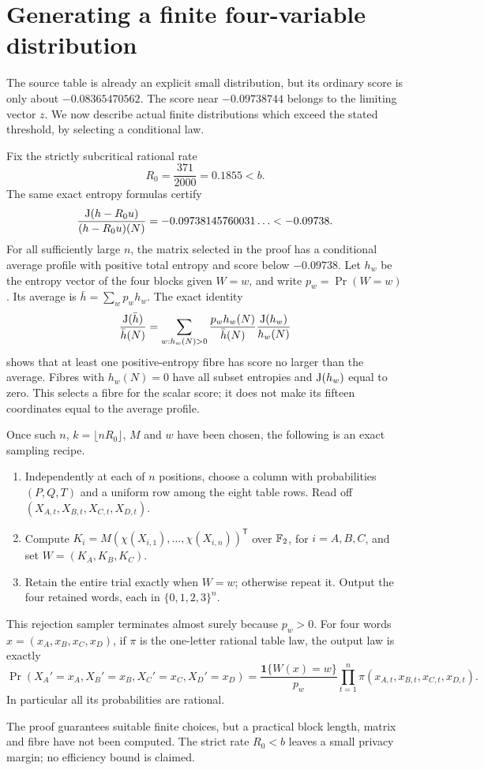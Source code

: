 \section{Generating a finite four-variable distribution}\label{sec:recipe}
The source table is already an explicit small distribution, but its
ordinary score is only about $-0.08365470562$. The score near
$-0.09738744$ belongs to the limiting vector $z$. We now describe actual
finite distributions which exceed the stated threshold, by selecting a conditional law.

Fix the strictly subcritical rational rate
\[
 R_0=\frac{371}{2000}=0.1855<b.
\]
The same exact entropy formulas certify
\[
 \frac{\operatorname{J}(h-R_0u)}{(h-R_0u)(N)}
 =-0.09738145760031\ldots<-0.09738.
\]
For all sufficiently large $n$, the matrix selected in the proof has a
conditional average profile with positive total entropy and score below
$-0.09738$. Let $h_w$ be the entropy vector of the four blocks given
$W=w$, and write $p_w=\Pr(W=w)$. Its average is
$\bar h=\sum_w p_w h_w$. The exact identity
\[
 \frac{\operatorname{J}(\bar h)}{\bar h(N)}
 =\sum_{w:h_w(N)>0}
    \frac{p_w h_w(N)}{\bar h(N)}
    \frac{\operatorname{J}(h_w)}{h_w(N)}
\]
shows that at least one positive-entropy fibre has score no larger than
the average. Fibres with $h_w(N)=0$ have all subset entropies and
$\operatorname{J}(h_w)$ equal to zero. This selects a fibre for the scalar score;
it does not make its fifteen coordinates equal to the average profile.

Once such $n$, $k=\lfloor nR_0\rfloor$, $M$ and $w$ have been chosen,
the following is an exact sampling recipe.
\begin{enumerate}[leftmargin=*]
\item Independently at each of $n$ positions, choose a column with
probabilities $(P,Q,T)$ and a uniform row among the eight table rows.
Read off $(X_{A,t},X_{B,t},X_{C,t},X_{D,t})$.
\item Compute $K_i=M(\chi(X_{i,1}),\ldots,\chi(X_{i,n}))^{\mathsf T}$
over $\mathbb F_2$, for $i=A,B,C$, and set $W=(K_A,K_B,K_C)$.
\item Retain the entire trial exactly when $W=w$; otherwise repeat it.
Output the four retained words, each in $\{0,1,2,3\}^n$.
\end{enumerate}
This rejection sampler terminates almost surely because $p_w>0$.
For four words $x=(x_A,x_B,x_C,x_D)$, if $\pi$ is the one-letter
rational table law, the output law is exactly
\[
 \Pr(X_A'=x_A,X_B'=x_B,X_C'=x_C,X_D'=x_D)
 =\frac{\mathbf1\{W(x)=w\}}{p_w}
      \prod_{t=1}^n\pi(x_{A,t},x_{B,t},x_{C,t},x_{D,t}).
\]
In particular all its probabilities are rational.

The proof guarantees suitable finite choices, but a practical block
length, matrix and fibre have not been computed. The strict rate
$R_0<b$ leaves a small privacy margin; no efficiency bound is claimed.

